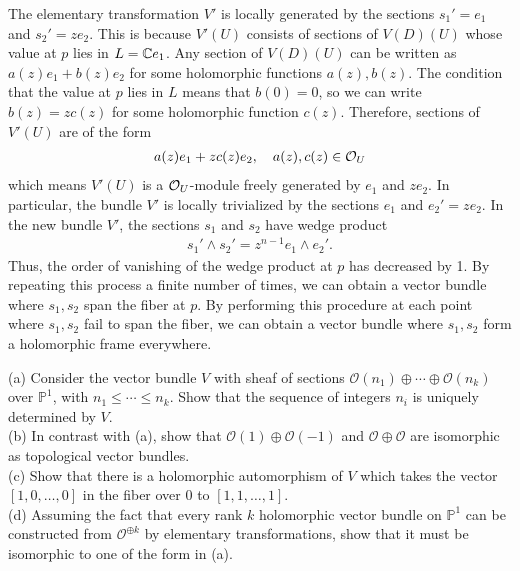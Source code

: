 \documentclass[12pt]{article}  %
\begin{document}
\begin{solution}
    The elementary transformation $V'$ is locally generated by the sections $s_1' = e_1$ and $s_2' = z e_2$. This is because $V'(U)$ consists of sections of $V(D)(U)$ whose value at $p$ lies in $L = \mathbb{C} e_1$. Any section of $V(D)(U)$ can be written as $a(z)e_1 + b(z)e_2$ for some holomorphic functions $a(z), b(z)$. The condition that the value at $p$ lies in $L$ means that $b(0) = 0$, so we can write $b(z) = z c(z)$ for some holomorphic function $c(z)$. Therefore, sections of $V'(U)$ are of the form \begin{align*}
        a(z)e_1 + z c(z)e_2, \quad a(z), c(z) \in {\mathcal{O}}_U
    \end{align*} which means $V'(U)$ is a ${\mathcal{O}}_U$-module freely generated by $e_1$ and $z e_2$. In particular, the bundle $V'$ is locally trivialized by the sections $e_1$ and $e_2' = z e_2$. In the new bundle $V'$, the sections $s_1$ and $s_2$ have wedge product \begin{align*}
        s_1' \wedge s_2' = z^{n-1} e_1 \wedge e_2'.
    \end{align*} Thus, the order of vanishing of the wedge product at $p$ has decreased by 1. By repeating this process a finite number of times, we can obtain a vector bundle where $s_1, s_2$ span the fiber at $p$. By performing this procedure at each point where $s_1, s_2$ fail to span the fiber, we can obtain a vector bundle where $s_1, s_2$ form a holomorphic frame everywhere.
\end{solution}

\begin{problem}[3]
(a) Consider the vector bundle $V$ with sheaf of sections $\mathcal{O}(n_1) \oplus \cdots \oplus \mathcal{O}(n_k)$ over $\mathbb{P}^1$, with $n_1 \le \cdots \le n_k$. Show that the sequence of integers $n_i$ is uniquely determined by $V$.\\
(b) In contrast with (a), show that $\mathcal{O}(1)\oplus\mathcal{O}(-1)$ and $\mathcal{O}\oplus\mathcal{O}$ are isomorphic as topological vector bundles.\\
(c) Show that there is a holomorphic automorphism of $V$ which takes the vector $[1,0,\dots,0]$ in the fiber over $0$ to $[1,1,\dots,1]$.\\
(d) Assuming the fact that every rank $k$ holomorphic vector bundle on $\mathbb{P}^1$ can be constructed from $\mathcal{O}^{\oplus k}$ by elementary transformations, show that it must be isomorphic to one of the form in (a).
\end{problem}

\begin{solution}
\end{solution}
\end{document}
